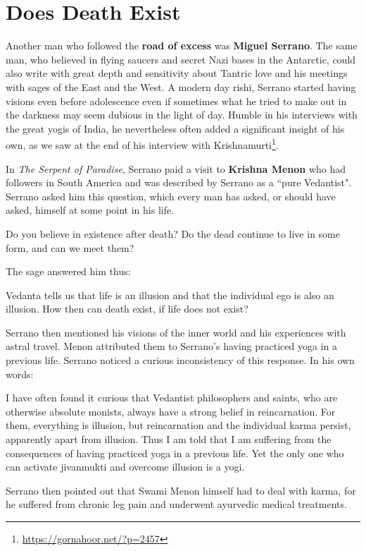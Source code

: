\section{Does Death Exist}

Another man who followed the \textbf{road of excess} was \textbf{Miguel Serrano}. The same man, who believed in flying saucers and secret Nazi bases in the Antarctic, could also write with great depth and sensitivity about Tantric love and his meetings with sages of the East and the West. A modern day rishi, Serrano started having visions even before adolescence even if sometimes what he tried to make out in the darkness may seem dubious in the light of day. Humble in his interviews with the great yogis of India, he nevertheless often added a significant insight of his own, as we saw at the end of his interview with Krishnamurti\footnote{\url{https://gornahoor.net/?p=2457}}.

In \textit{The Serpent of Paradise}, Serrano paid a visit to \textbf{Krishna Menon} who had followers in South America and was described by Serrano as a ``pure Vedantist". Serrano asked him this question, which every man has asked, or should have asked, himself at some point in his life.

\begin{quotex}
Do you believe in existence after death? Do the dead continue to live in some form, and can we meet them?

\end{quotex}
The sage answered him thus:

\begin{quotex}
Vedanta tells us that life is an illusion and that the individual ego is also an illusion. How then can death exist, if life does not exist?

\end{quotex}
Serrano then mentioned his visions of the inner world and his experiences with astral travel. Menon attributed them to Serrano's having practiced yoga in a previous life. Serrano noticed a curious inconsistency of this response. In his own words:

\begin{quotex}
I have often found it curious that Vedantist philosophers and saints, who are otherwise absolute monists, always have a strong belief in reincarnation. For them, everything is illusion, but reincarnation and the individual karma persist, apparently apart from illusion. Thus I am told that I am suffering from the consequences of having practiced yoga in a previous life. Yet the only one who can activate jivanmukti and overcome illusion is a yogi. 

\end{quotex}
Serrano then pointed out that Swami Menon himself had to deal with karma, for he suffered from chronic leg pain and underwent ayurvedic medical treatments.

